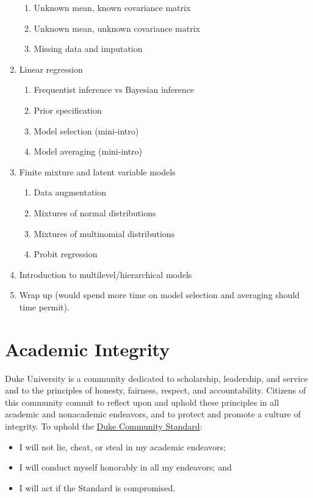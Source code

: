 \documentclass[11pt, a4paper]{article}
\begin{document}
\begin{enumerate}[label= {\color{darkblue}{\ArrowBoldRightStrobe}}]
	\begin{enumerate}[label= {\color{cyan}{\Rectangle}}]
		\item Unknown mean, known covariance matrix
		\item Unknown mean, unknown covariance matrix
		\item Missing data and imputation
	\end{enumerate}
	\item Linear regression
	\begin{enumerate}[label= {\color{cyan}{\Rectangle}}]
		\item Frequentist inference vs Bayesian inference
		\item Prior specification
		\item Model selection (mini-intro)
		\item Model averaging (mini-intro)
	\end{enumerate}
	\item Finite mixture and latent variable models 
	\begin{enumerate}[label= {\color{cyan}{\Rectangle}}]
		\item Data augmentation
		\item Mixtures of normal distributions
		\item Mixtures of multinomial distributions
		\item Probit regression
	\end{enumerate}
	\item Introduction to multilevel/hierarchical models
	\item Wrap up (would spend more time on model selection and averaging should time permit).
\end{enumerate}


\section{Academic Integrity}  
Duke University is a community dedicated to scholarship, leadership, and service and to the principles of honesty, fairness, respect, and accountability. Citizens of this community commit to reflect upon and uphold these principles in all academic and nonacademic endeavors, and to protect and promote a culture of integrity. To uphold the \href{https://studentaffairs.duke.edu/conduct/about-us/duke-community-standard}{Duke Community Standard}:
\begin{itemize}[label= {\color{darkred}{\Large \HandRight}}]
	\item I will not lie, cheat, or steal in my academic endeavors;
	\item I will conduct myself honorably in all my endeavors; and
	\item I will act if the Standard is compromised.
\end{itemize}
\end{document}
